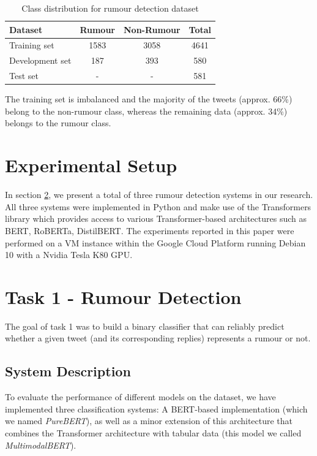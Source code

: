 \documentclass[11pt,a4paper]{article}
\begin{document}
\begin{table}
\centering
\setlength\tabcolsep{2pt}
\begin{tabular}{lccc}
\hline
\textbf{Dataset}         & Rumour & Non-Rumour & Total \\ \hline
Training set    & 1583   & 3058       & 4641  \\
Development set & 187    & 393        & 580   \\
Test set        & -      & -          & 581   \\ \hline
\end{tabular}
\caption{Class distribution for rumour detection dataset}
\label{tab:dataset_class_distribution}
\end{table}
The training set is imbalanced and the majority of the tweets (approx. 66\%) belong to the non-rumour class, whereas the remaining data (approx. 34\%) belongs to the rumour class.

\section{Experimental Setup}
In section \ref{sec:task_1_rumour_detection}, we present a total of three rumour detection systems in our research.
All three systems were implemented in Python and make use of the Transformers library \citep{RN682} which provides access to various Transformer-based architectures such as BERT, RoBERTa, DistilBERT. 
\newline
The experiments reported in this paper were performed on a VM instance within the Google Cloud Platform running Debian 10 with a Nvidia Tesla K80 GPU.


\section{Task 1 - Rumour Detection}
\label{sec:task_1_rumour_detection}
The goal of task 1 was to build a binary classifier that can reliably predict whether a given tweet (and its corresponding replies) represents a rumour or not.

\subsection{System Description}
To evaluate the performance of different models on the dataset, we have implemented three classification systems: A BERT-based implementation (which we named \textit{PureBERT}), as well as a minor extension of this architecture that combines the Transformer architecture with tabular data (this model we called \textit{MultimodalBERT}).
\end{document}
